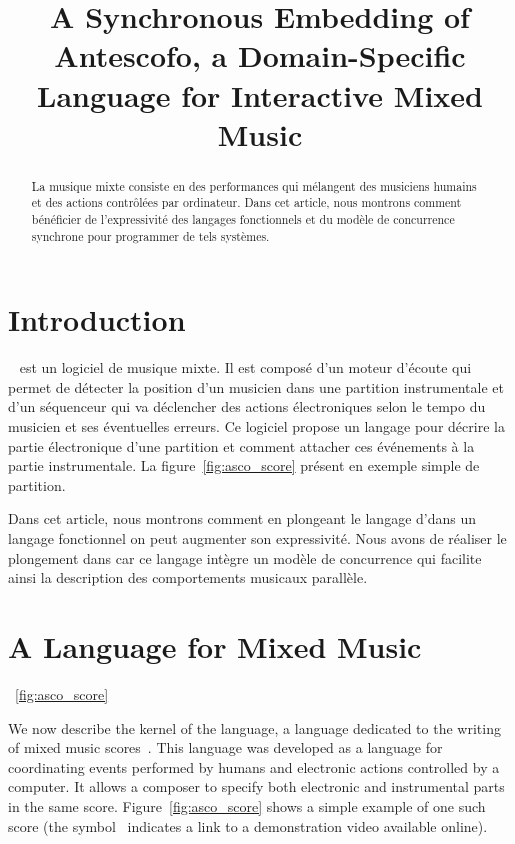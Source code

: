 \documentclass[preprint]{sigplanconf}
\title{A Synchronous Embedding of Antescofo, a Domain-Specific Language for Interactive Mixed Music}
\begin{document}
\maketitle

\begin{abstract}
  La musique mixte consiste en des performances qui mélangent des
  musiciens humains et des actions contrôlées par ordinateur. Dans cet
  article, nous montrons comment bénéficier de l'expressivité des
  langages fonctionnels et du modèle de concurrence synchrone pour
  programmer de tels systèmes.
\end{abstract}

\section{Introduction}

\Antescofo~\cite{antescofo} est un logiciel de musique mixte. Il est
composé d'un moteur d'écoute qui permet de détecter la position d'un
musicien dans une partition instrumentale et d'un séquenceur qui va
déclencher des actions électroniques selon le tempo du musicien et ses
éventuelles erreurs. Ce logiciel propose un langage pour décrire la
partie électronique d'une partition et comment attacher ces événements
à la partie instrumentale. La figure~\ref{fig:asco_score} présent en
exemple simple de partition.

Dans cet article, nous montrons comment en plongeant le langage
d'\Antescofo dans un langage fonctionnel on peut augmenter son
expressivité. Nous avons de réaliser le plongement dans \rml car ce
langage intègre un modèle de concurrence qui facilite ainsi la
description des comportements musicaux parallèle.

\section{A Language for Mixed Music}
\label{sec:antescofo}~\ref{fig:asco_score}

We now describe the kernel of the \Antescofo language, a language
dedicated to the writing of mixed music
scores~\cite{echeveste2012antescofo}. This language was developed as a
language for coordinating events performed by humans and electronic
actions controlled by a computer.  It allows a composer to specify
both electronic and instrumental parts in the same
score. Figure~\ref{fig:asco_score} shows a simple example of one such
score (the symbol~\video{} indicates a link to a demonstration video
available online).
\end{document}

